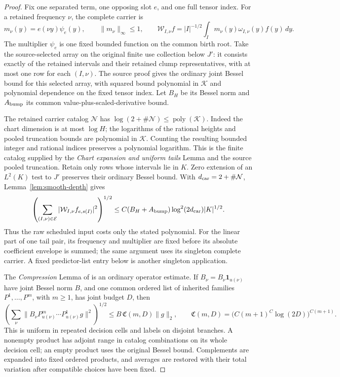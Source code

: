 \begin{proof}
Fix one separated term, one opposing slot \(e\), and one full tensor
index.  For a retained frequency \(\nu\), the complete carrier is
\[
 m_\nu(y)=e(\nu y)\psi_e(y),\qquad \|m_\nu\|_\infty\le1,
 \qquad
 \mathcal W_{I,\nu}f
   =|I|^{-1/2}\int_I m_\nu(y)\omega_{I,\nu}(y)f(y)\,dy.
\]
The multiplier \(\psi_e\) is one fixed bounded function on the
common birth root.  Take the source-selected array on the original finite use
collection below \(J'\): it consists exactly of the retained intervals
and their retained clump representatives, with
at most one row for each \((I,\nu)\).  The source proof gives the
ordinary joint Bessel bound for this selected array, with squared
bound polynomial in \(\mathcal K\) and polynomial dependence on the
fixed tensor index.  Let \(B_H\) be its Bessel norm and
\(A_{\rm bump}\) its common value-plus-scaled-derivative bound.

The retained carrier catalog \(\mathcal N\) has
\(\log(2+\#\mathcal N)\le\operatorname{poly}(\mathcal K)\).
Indeed the chart dimension is at most \(\log H\); the logarithms of
the rational heights and pooled truncation bounds are polynomial
in \(\mathcal K\).  Counting the resulting bounded integer and
rational indices preserves a polynomial logarithm.  This is the
finite catalog supplied by the \emph{Chart expansion and uniform
tails} Lemma and the source pooled truncation.  Retain only rows
whose intervals lie in \(K\).  Zero extension of an \(L^2(K)\)
test to \(J'\) preserves their ordinary Bessel bound.  With
\(d_{\rm car}=2+\#\mathcal N\), Lemma~\ref{lem:smooth-depth} gives
\begin{equation}
 \left(\sum_{(I,\nu)\in\mathcal E}
      |\mathcal W_{I,\nu}f_{e,s(I)}|^2\right)^{1/2}
 \le C(B_H+A_{\rm bump})\log^2(2d_{\rm car})|K|^{1/2}.         \label{eq:h-smooth-use}
\end{equation}
Thus the raw scheduled input costs only the stated polynomial.
For the linear part of one tail pair, its frequency and multiplier
are fixed before its absolute coefficient envelope is summed;
the same argument uses its singleton complete carrier.  A fixed
predictor-list entry below is another singleton application.

The \emph{Compression} Lemma of \cite[Section~3]{H} is an ordinary
operator estimate.  If \(B_\nu=B_\nu\mathbf1_{u(\nu)}\) have joint
Bessel norm \(B\), and one common ordered list of inherited families
\(P^1,\ldots,P^m\), with \(m\ge1\), has joint budget \(D\), then
\begin{equation}
 \left(\sum_\nu
   \|B_\nu P^m_{u(\nu)}\cdots P^1_{u(\nu)}g\|^2\right)^{1/2}
 \le B\,\mathfrak C(m,D)\|g\|_2,\qquad
 \mathfrak C(m,D)=
 \bigl(C(m+1)^C\log(2D)\bigr)^{C(m+1)}.                       \label{eq:h-compression}
\end{equation}
This is uniform in repeated decision cells and labels on disjoint
branches.  A nonempty product has adjoint range in catalog
combinations on its whole decision cell; an empty product uses the
original Bessel bound.  Complements are expanded
into fixed ordered products, and averages are restored with their
total variation after compatible choices have been fixed.


\end{proof}

